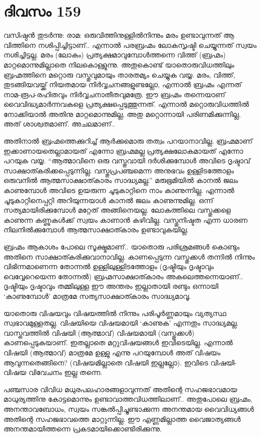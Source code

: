 \section{ദിവസം 159}


വസിഷ്ഠൻ തുടർന്നു: രാമ: ഒരുവിത്തിനുള്ളിൽനിന്നും മരം ഉണ്ടാവുന്നത് ആ വിത്തിനെ നശിപ്പിച്ചിട്ടാണ്‌.. എന്നാൽ പരബ്രഹ്മം ലോകസൃഷ്ടി ചെയ്യുന്നത് സ്വയം നശിച്ചിട്ടല്ല. മരം (ലോകം) പ്രത്യക്ഷമാവുമ്പോൾത്തന്നെ വിത്ത് (ബ്രഹ്മം) മാറ്റമൊന്നുമില്ലാതെ നിലകൊള്ളുന്നു. അതുകൊണ്ട് യാതൊരുവിധത്തിലും ബ്രഹ്മത്തിനെ മറ്റൊരു വസ്തുവുമായും താരതമ്യം ചെയ്യുക വയ്യ. മരം, വിത്ത്, തുടങ്ങിയവയ്ക്ക് നിയതമായ നിർവ്വചനങ്ങളുണ്ടല്ലോ, എന്നാൽ ബ്രഹ്മം എന്നത് നാമ-രൂപ-രഹിതവും നിർവ്വചനാതീതവുമത്രേ. ഈ ബ്രഹ്മം തന്നെയാണ്‌ വൈവിദ്ധ്യമാർന്നവകളെ പ്രത്യക്ഷപ്പെടുത്തുന്നത്. എന്നാൽ മറ്റൊരുവിധത്തിൽ നോക്കിയാൽ അതിനു മാറ്റമൊന്നുമില്ല, അതു മറ്റൊന്നായി പരിണമിക്കുന്നില്ല, അത് ശാശ്വതമാണ്‌. അചലമാണ്‌..

അതിനാൽ ബ്രഹ്മത്തെക്കുറിച്ച് ആർക്കുമൊരു തത്വം പറയാനാവില്ല. ബ്രഹ്മമാണ്‌ ഇക്കാണായതെല്ലാമായത് എന്നോ ബ്രഹ്മമല്ല പ്രത്യക്ഷലോകമായത് എന്നോ പറയുക വയ്യ. “ആത്മാവിനെ ഒരു വസ്തുവായി ദർശിക്കുമ്പോൾ അവിടെ ദൃഷ്ടാവ് സാക്ഷാത്കരിക്കപ്പെടുന്നില്ല. വസ്തുപ്രപഞ്ചമെന്ന അനുഭവം ഉള്ളിടത്തോളം ഒരുവനിൽ ആത്മസാക്ഷാത്കാരം സാദ്ധ്യമല്ല.” മരുഭൂമിയിൽ കാനൽ ജലം കാണുമ്പോൾ അവിടെ ഉയരുന്ന ചൂടുകാറ്റിനെ നാം കാണുന്നില്ല. എന്നാൽ ചൂടുകാറ്റിനെപ്പറ്റി അറിയുന്നയാൾ കാനൽ ജലം കാണുന്നുമില്ല. ഒന്ന് സത്യമായിരിക്കുമ്പോള്‍ മറ്റേത് അങ്ങിനെയല്ല. ലോകത്തിലെ വസ്തുക്കളെ കാണുന്ന കണ്ണുകൾക്ക് സ്വയം കാണാൻ കഴിവില്ല. വസ്തുനിഷ്ടത എന്ന ധാരണ നിലനിൽക്കുമ്പോൾ ആത്മസാക്ഷാത്കാരം ഉണ്ടാവുകയില്ല.

ബ്രഹ്മം ആകാശം പോലെ സൂക്ഷ്മമാണ്‌.. യാതൊരു പരിശ്രമങ്ങൾ കൊണ്ടും അതിനെ സാക്ഷാത്കരിക്കുവാനാവില്ല. കാണപ്പെടുന്ന വസ്തുക്കൾ തന്നിൽ നിന്നും വിഭിന്നമാണെന്ന തോന്നൽ ഉള്ളിലുള്ളിടത്തോളം (ദൃഷ്ടിയും ദൃഷ്ടാവും വെവ്വേറെയെന്ന തോന്നൽ) ബ്രഹ്മസാക്ഷാത്കാരം അകലെത്തന്നെയാണ്‌..  ദൃഷ്ടിയും ദൃഷ്ടാവും തമ്മിലുള്ള ഈ അന്തരം ഇല്ലാതായി രണ്ടും ഒന്നായി ‘കാണുമ്പോൾ’ മാത്രമേ സത്യസാക്ഷാത്കാരം സാദ്ധ്യമാവൂ.

യാതൊരു വിഷയവും വിഷയത്തിൽ നിന്നും പരിപൂർണ്ണമായും വ്യത്യസ്ഥ സ്വഭാവമുള്ളതല്ല. വിഷയിയെ വിഷയമായി ‘കാണുക’ എന്നതും സാദ്ധ്യമല്ല. വാസ്തവത്തിൽ വിഷയി (ആത്മാവ്) വിഷയമായി (വസ്തുക്കൾ) കാണപ്പെടുകയാണ്‌. ഇതല്ലാതെ മറ്റുവിഷയങ്ങൾ ഇവിടെയില്ല. എന്നാൽ വിഷയി (ആത്മാവ്) മാത്രമേ ഉള്ളു എന്നു പറയുമ്പോൾ അത് വിഷയം ആവുന്നതെങ്ങിനെ? (വിഷയമില്ലാതെ വിഷയി ഇല്ലല്ലോ). ഇവിടെ വിഷയി-വിഷയ വിവേചനം ഇല്ല തന്നെ.

പഞ്ചസാര വിവിധ മധുരപലഹാരങ്ങളാവുന്നത് അതിന്റെ സഹജഭാവമായ മാധുര്യത്തിനു കോട്ടമൊന്നും ഉണ്ടാവാത്തവിധത്തിലാണ്‌..  അതുപോലെ ബ്രഹ്മം, അനന്താവബോധം, സ്വയം സങ്കല്‍പ്പിച്ചുണ്ടാക്കുന്ന അനന്തമായ വൈവിധ്യങ്ങൾ അതിന്റെ സഹജഭാവത്തെ മാറ്റുന്നില്ല. ഈ എണ്ണമില്ലാത്ത വൈജാത്യങ്ങൾ അനന്തമായിത്തന്നെ പ്രകടമായിക്കൊണ്ടിരിക്കുന്നു. 
